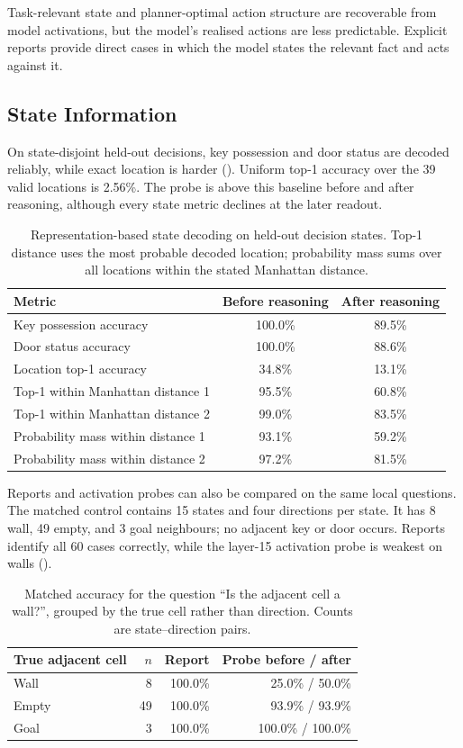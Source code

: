 \documentclass{article}
\begin{document}
Task-relevant state and planner-optimal action structure are recoverable from model activations, but the model's realised actions are less predictable. Explicit reports provide direct cases in which the model states the relevant fact and acts against it.

\subsection{State Information}\label{sec:belief-results}
On state-disjoint held-out decisions, key possession and door status are decoded reliably, while exact location is harder (). Uniform top-1 accuracy over the 39 valid locations is 2.56\%. The probe is above this baseline before and after reasoning, although every state metric declines at the later readout.

\begin{table}[htbp]
\centering\small
\begin{tabular}{lcc}
\toprule
Metric & Before reasoning & After reasoning \\
\midrule
Key possession accuracy & 100.0\% & 89.5\% \\
Door status accuracy & 100.0\% & 88.6\% \\
Location top-1 accuracy & 34.8\% & 13.1\% \\
Top-1 within Manhattan distance 1 & 95.5\% & 60.8\% \\
Top-1 within Manhattan distance 2 & 99.0\% & 83.5\% \\
Probability mass within distance 1 & 93.1\% & 59.2\% \\
Probability mass within distance 2 & 97.2\% & 81.5\% \\
\bottomrule
\end{tabular}
\caption{Representation-based state decoding on held-out decision states. Top-1 distance uses the most probable decoded location; probability mass sums over all locations within the stated Manhattan distance.}
\label{tab:rep-beliefs}
\end{table}

Reports and activation probes can also be compared on the same local questions. The matched control contains 15 states and four directions per state. It has 8 wall, 49 empty, and 3 goal neighbours; no adjacent key or door occurs. Reports identify all 60 cases correctly, while the layer-15 activation probe is weakest on walls ().

\begin{table}[htbp]
\centering\small
\begin{tabular}{lrrr}
\toprule
True adjacent cell & $n$ & Report & Probe before / after \\
\midrule
Wall & 8 & 100.0\% & 25.0\% / 50.0\% \\
Empty & 49 & 100.0\% & 93.9\% / 93.9\% \\
Goal & 3 & 100.0\% & 100.0\% / 100.0\% \\
\bottomrule
\end{tabular}
\caption{Matched accuracy for the question ``Is the adjacent cell a wall?'', grouped by the true cell rather than direction. Counts are state--direction pairs.}
\label{tab:matched-wall}
\end{table}
\end{document}
